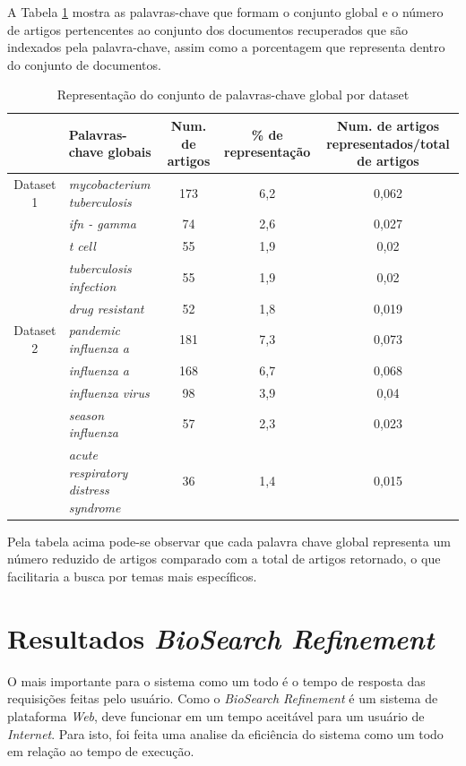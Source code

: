 A Tabela \ref{tab:representacao} mostra as palavras-chave que formam o conjunto global e o número de artigos pertencentes ao conjunto dos documentos recuperados que são indexados pela palavra-chave, assim como a porcentagem que representa dentro do conjunto de documentos. 

\begin{table}[htbp]
\center
\begin{tabular}{|l|p{4cm}|c|c|c|}
\hline
 & \textbf{Palavras-chave globais} & \multicolumn{1}{p{3cm}|}{\textbf{Num. de artigos}} & \multicolumn{1}{p{3cm}|}{\textbf{\% de representação}} & \multicolumn{1}{p{3cm}|}{\textbf{Num. de artigos representados/total de artigos}} \\ \hline
\multicolumn{ 1}{|c|}{Dataset 1} & \textit{mycobacterium tuberculosis} & 173 & 6,2 & 0,062 \\ \cline{ 2- 5}
\multicolumn{ 1}{|l|}{} & \textit{ifn - gamma} & 74 & 2,6 & 0,027 \\ \cline{ 2- 5}
\multicolumn{ 1}{|l|}{} & \textit{t cell} & 55 & 1,9 & 0,02 \\ \cline{ 2- 5}
\multicolumn{ 1}{|l|}{} & \textit{tuberculosis infection} & 55 & 1,9 & 0,02 \\ \cline{ 2- 5}
\multicolumn{ 1}{|l|}{} & \textit{drug resistant} & 52 & 1,8 & 0,019 \\ \hline
\multicolumn{ 1}{|c|}{Dataset 2} & \textit{pandemic influenza a} & 181 & 7,3 & 0,073 \\ \cline{ 2- 5}
\multicolumn{ 1}{|l|}{} & \textit{influenza a} & 168 & 6,7 & 0,068 \\ \cline{ 2- 5}
\multicolumn{ 1}{|l|}{} & \textit{influenza virus} & 98 & 3,9 & 0,04 \\ \cline{ 2- 5}
\multicolumn{ 1}{|l|}{} & \textit{season influenza} & 57 & 2,3 & 0,023 \\ \cline{ 2- 5}
\multicolumn{ 1}{|l|}{} & \textit{acute respiratory distress syndrome} & 36 & 1,4 & 0,015 \\ \hline
\end{tabular}
\caption{Representação do conjunto de palavras-chave global por dataset}
\label{tab:representacao}
\end{table}

Pela tabela acima pode-se observar que cada palavra chave global representa um número reduzido de artigos comparado com a total de artigos retornado, o que facilitaria a busca por temas mais específicos.

\section{Resultados \emph{BioSearch Refinement}}
O mais importante para o sistema como um todo é o tempo de resposta das requisições feitas pelo usuário. Como o \emph{BioSearch Refinement} é um sistema de plataforma \emph{Web}, deve funcionar em um tempo aceitável para um usuário de \emph{Internet}. Para isto, foi feita uma analise da eficiência do sistema como um todo em relação ao tempo de execução.

